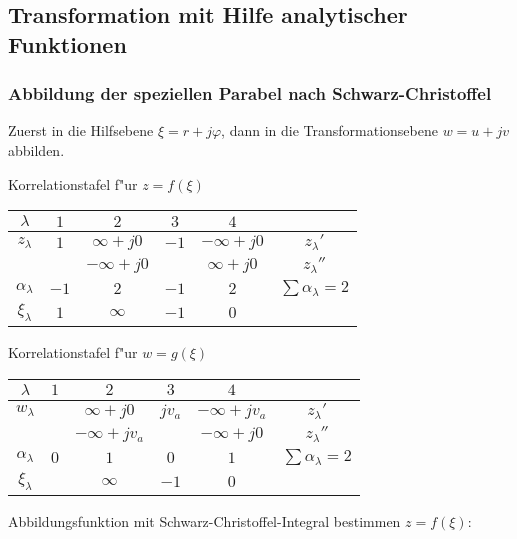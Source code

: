 \clearpage
\subsection{Transformation mit Hilfe analytischer Funktionen}
\subsubsection{Abbildung der speziellen Parabel nach Schwarz-Christoffel}
Zuerst in die Hilfsebene $\xi=r+j\varphi$, dann in die Transformationsebene
$w=u+jv$ abbilden.

Korrelationstafel f"ur $z=f(\xi)$
\begin{center}\begin{tabular}{c||c|c|c|c|c}
$\lambda$          & $1$ & $2$          & $3$  & $4$          &  \\ \hline \hline
$z_{\lambda}$      & $1$ & $\infty +j0$ & $-1$ & $-\infty +j0$& $z_{\lambda}'$\\
                   &     & $-\infty +j0$&      & $\infty +j0$ & $z_{\lambda}''$ \\ \hline
$\alpha_{\lambda}$ & $-1$& $2$          & $-1$ & $2$          & $\sum \alpha_{\lambda}=2$ \\ \hline
$\xi_{\lambda}$    & $1$ & $\infty$     & $-1$ & $0$          &  \\
\end{tabular}\end{center}

Korrelationstafel f"ur $w=g(\xi)$
\begin{center}\begin{tabular}{c||c|c|c|c|c}
$\lambda$          & $1$ & $2$             & $3$    & $4$             &  \\ \hline \hline
$w_{\lambda}$      &     & $\infty +j0$    & $jv_a$ & $-\infty +jv_a$ & $z_{\lambda}'$ \\
                   &     & $-\infty +jv_a$ &        & $-\infty +j0$   & $z_{\lambda}''$\\ \hline
$\alpha_{\lambda}$ & $0$ & $1$             & $0$    & $1$             & $\sum \alpha_{\lambda}=2$ \\ \hline
$\xi_{\lambda}$    &     & $\infty$        & $-1$   & $0$             &  \\
\end{tabular}\end{center}

Abbildungsfunktion mit Schwarz-Christoffel-Integral bestimmen
$z=f(\xi)$:

